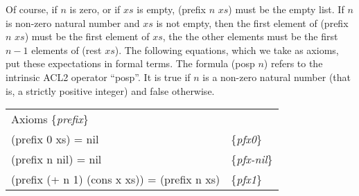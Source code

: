Of course, if $n$ is zero, or if $xs$ is empty, (prefix $n$ $xs$) must be the empty list. If $n$ is non-zero natural number and $xs$ is not empty, then the first element of (prefix $n$ $xs$) must be the first element of $xs$, the the other elements must be the first $n-1$ elements of (rest $xs$). The following equations, which we take as axioms, put these expectations in formal terms. The formula (posp $n$) refers to the intrinsic ACL2 operator ``posp''. It is true if $n$ is a non-zero natural number (that is, a strictly positive integer) and false otherwise.

\label{prefix-equations}
\begin{center}
\begin{tabular}{ll}
Axioms \{\emph{prefix}\}                                           \\
(prefix 0 xs) = nil                          & \{\emph{pfx0}\}     \\
(prefix n nil) =  nil                        & \{\emph{pfx-nil}\}  \\
(prefix (+ n 1) (cons x xs)) = (prefix n xs) & \{\emph{pfx1}\}     \\
\end{tabular}
\end{center}

